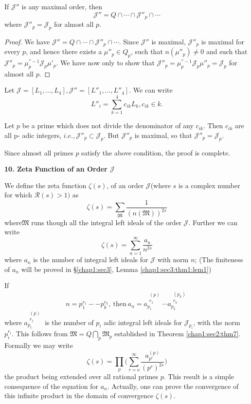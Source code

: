 \begin{theorem}\label{chap1:sec2:thm9} %
  If $\mathcal{J}''$ is any maximal order, then
  $$
  \mathcal{J}'' = Q \cap \cdots \cap \mathcal{J}''_p \cap \cdots
  $$
  where $\mathcal{J}''_p = \mathcal{J}_p$ for almost all $p$.
\end{theorem}

\begin{proof}
  We have $\mathcal{J}'' = Q \cap \cdots \cap \mathcal{J}''_p \cap
  \cdots$. Since $\mathcal{J}''$ is maximal, $\mathcal{J}''_p$ is
  maximal for every $p$, and hence there exists a $\mu''_{p} \in Q_p$,
  such that $n(\mu''_p) \neq 0$ and such that $\mathcal{J}''_p =
  \mu^{''-1}_p \mathcal{J}_p \mu'_{p}$. We have now only to show that
  $\mathcal{J}''_p = \mu^{''-1}_p \mathcal{J}_p \mu''_p = \mathcal{J}_p$
  for almost all $p$. 
\end{proof}

Let $\mathcal{J} = [L _1,  \ldots,  L_4], \mathcal{J}'' =
[L''_1,  \ldots,  L''_4]$. We can write 
$$
L''_i = \sum^4_{k=1} c_{ik} L_k,  c_{ik} \in k.
$$

Let $p$ be a prime which does not divide the denominator of any
$c_{ik}$. Then $c_{ik}$ are all p- adic integers, $i.e.,
\mathcal{J}''_p \subset \mathcal{J}_p$. But $\mathcal{J}''_p$ is
maximal, so that $\mathcal{J}''_p = \mathcal{J}_p$. 

Since almost all primes $p$ satisfy the above condition, the proof is
complete. 

\noindent \textbf{10. Zeta Function of an Order $\mathcal{J}$}

We define the zeta function $\zeta(s)$, of an order
$\mathcal{J}$(where $s$ is a complex number for which $\mathscr{R}(s)
> 1)$ as  
 $$
\zeta(s) = \sum_{\mathfrak{M}} \frac{1}{(n(\mathfrak{M}))^{2s}}
$$
where\pageoriginale $\mathfrak{M}$ runs though all the integral left ideals of the
order $\mathcal{J}$. Further we can write 
$$
\zeta(s) = \sum^\infty_{n=1} \frac{a_n}{n^{2s}}
$$
where $a_n $ is the number of integral left ideals for $\mathcal{J}$
with norm $n$; (The finiteness of $a_n$ will be proved in
\S \ref{chap1:sec3}, Lemma \ref{chap1:sec3:thm1:lem1}) 

If
$$
 n= p^{r_1}_1 -- p^{r_k}_{k}, ~\text{then}~ a_n =
 a^{\substack{(p)\\{r_1}}}_{p_1} \cdots a^{\substack{(p_k)\\{r_k}}}_{p_k} 
$$	
where $a^{\substack{(p)\\{r_1}}}_{p_1}$ is the number of $p_i$ adic integral
left ideals for $\mathcal{J}_{p_i}$, with the norm $p_i^{r_i}$. This
follows from  $\mathfrak{M} = Q \bigcap \limits_{p} \mathfrak{M}_p$
established in Theorem \ref{chap1:sec2:thm7}. Formally we may write 
$$
\zeta (s) = \prod_p \bigg( \sum^{\infty}_{r=o}
\frac{a^{(p)}_{p^r}}{(p^r)^{2s}}  \bigg) 
$$
the product being extended over all rational primes $p$. This result
is a simple consequence of the equation for $a_n$. Actually, one can
prove the convergence of this infinite product in the domain of
convergence $\zeta(s)$.

